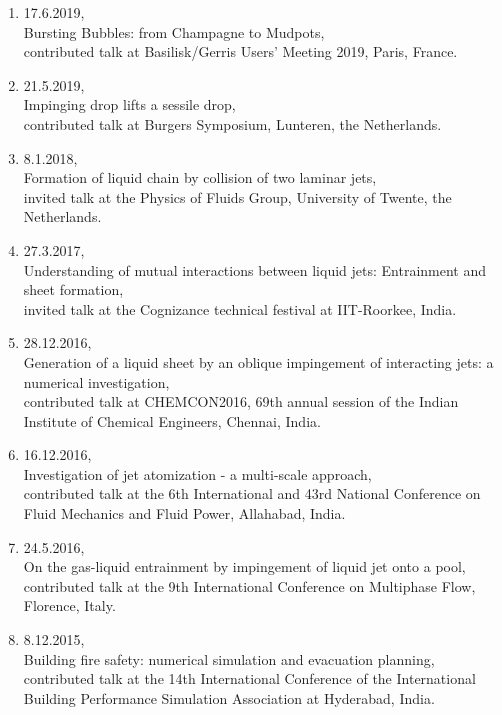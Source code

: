 \documentclass[11pt,a4paper,roman,english,colorlinks,linkcolor=true]{moderncv}
\begin{document}
\begin{enumerate}[leftmargin=2.5cm]
	\item 17.6.2019,\\
	Bursting Bubbles: from Champagne to Mudpots,\\
	contributed talk at Basilisk/Gerris Users' Meeting 2019, Paris, France.
	
	\item 21.5.2019,\\
	Impinging drop lifts a sessile drop,\\
	contributed talk at Burgers Symposium, Lunteren, the Netherlands.
		
	\item 8.1.2018,\\
	Formation of liquid chain by collision of two laminar jets,\\
	invited talk at the Physics of Fluids Group, University of Twente, the Netherlands.
	
	\item 27.3.2017,\\
	Understanding of mutual interactions between liquid jets: Entrainment and sheet formation,\\
	invited talk at the Cognizance technical festival at IIT-Roorkee, India.
	
	\item 28.12.2016,\\
	Generation of a liquid sheet by an oblique impingement of interacting jets: a numerical investigation,\\
	contributed talk at CHEMCON2016, 69th annual session of the Indian Institute of Chemical Engineers, Chennai, India.
	
	\item 16.12.2016,\\
	Investigation of jet atomization - a multi-scale approach,\\
	contributed talk at the 6th International and 43rd National Conference on Fluid Mechanics and Fluid Power, Allahabad, India.
	
	\item 24.5.2016,\\
	On the gas-liquid entrainment by impingement of liquid jet onto a pool,\\
	contributed talk at the 9th International Conference on Multiphase Flow, Florence, Italy.
	
	\item 8.12.2015,\\
	Building fire safety: numerical simulation and evacuation planning,\\
	contributed talk at the 14th International Conference of the International Building Performance Simulation Association at Hyderabad, India.
\end{enumerate}
\end{document}
